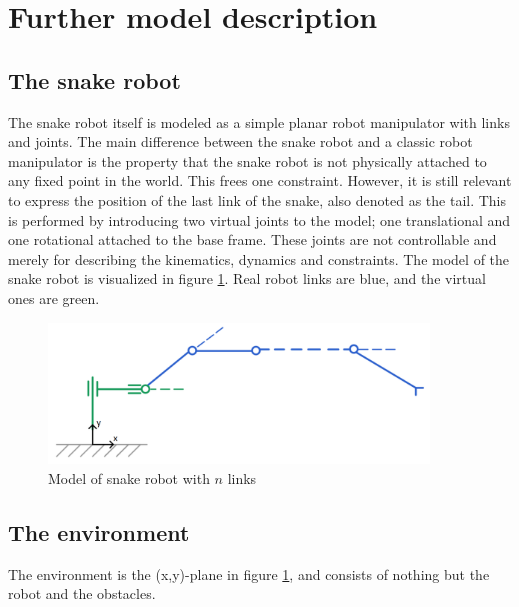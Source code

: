 
\section{Further model description}

\subsection{The snake robot}
The snake robot itself is modeled as a simple planar robot manipulator with links and joints. The main difference between the snake robot and a classic robot manipulator is the property that the snake robot is not physically attached to any fixed point in the world. This frees one constraint. However, it is still relevant to express the position of the last link of the snake, also denoted as the tail. This is performed by introducing two virtual joints to the model; one translational and one rotational attached to the base frame. These joints are not controllable and merely for describing the kinematics, dynamics and constraints. The model of the snake robot is visualized in figure \ref{fig:2_kin}. Real robot links are blue, and the virtual ones are green.

\begin{figure}
    \centering
    \includegraphics[width=0.9\textwidth]{figures/kinematics_noname.PNG}
    \caption{Model of snake robot with $n$ links}
    \label{fig:2_kin}
\end{figure}


\subsection{The environment}
The environment is the (x,y)-plane in figure \ref{fig:2_kin}, and consists of nothing but the robot and the obstacles.

